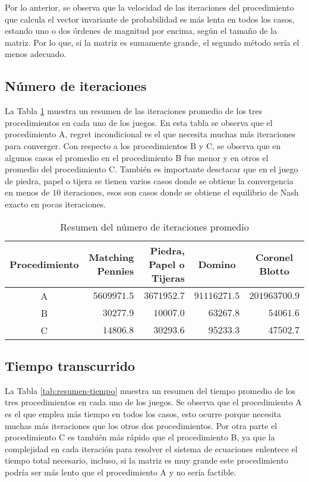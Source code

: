 Por lo anterior, se observa que la velocidad de las iteraciones del procedimiento que calcula el vector invariante de probabilidad es más lenta en todos los casos, estando uno o dos órdenes de magnitud por encima, según el tamaño de la matriz. Por lo que, si la matriz es sumamente grande, el segundo método sería el menos adecuado.

\subsection{Número de iteraciones}

La Tabla \ref{tab:resumen-iteraciones} muestra un resumen de las iteraciones promedio de los tres procedimientos en cada uno de los juegos. En esta tabla se observa que el procedimiento A, regret incondicional es el que necesita muchas más iteraciones para converger. Con respecto a los procedimientos B y C, se observa que en algunos casos el promedio en el procedimiento B fue menor y en otros el promedio del procedimiento C. También es importante desctacar que en el juego de piedra, papel o tijera se tienen varios casos donde se obtiene la convergencia en menos de $10$ iteraciones, esos son casos donde se obtiene el equilibrio de Nash exacto en pocas iteraciones.

\begin{table}[ht]
    \centering
    \begin{tabular}{c|r|r|r|r}
       \scriptsize{Procedimiento}  & \scriptsize{Matching Pennies} & \scriptsize{Piedra, Papel o Tijeras} & \multicolumn{1}{c|}{\scriptsize{Domino}} & \multicolumn{1}{c}{\scriptsize{Coronel Blotto}}  \\ \hline
       A & $5609971.5$ & $3671952.7$ & $91116271.5$ & $201963700.9$ \\
       B & $30277.9$   & $10007.0$ & $63267.8$ & $54061.6$ \\
       C & $14806.8$   & $30293.6$ & $95233.3$ & $47502.7$ \\ \hline
    \end{tabular}
    \caption{Resumen del número de iteraciones promedio}
    \label{tab:resumen-iteraciones}
\end{table}

\subsection{Tiempo transcurrido}

La Tabla \ref{tab:resumen-tiempo} muestra un resumen del tiempo promedio de los tres procedimientos en cada uno de los juegos. Se observa que el procedimiento A es el que emplea más tiempo en todos los casos, esto ocurre porque necesita muchas más iteraciones que los otros dos procedimientos. Por otra parte el procedimiento C es también más rápido que el procedimiento B, ya que la complejidad en cada iteración para resolver el sistema de ecuaciones enlentece el tiempo total necesario, incluso, si la matriz es muy grande este procedimiento podría ser más lento que el procedimiento A y no sería factible.


